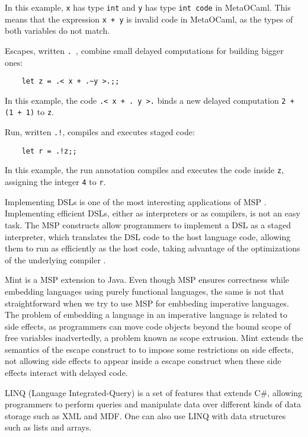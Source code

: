 \documentclass[english]{llncs}
\begin{document}
In this example, \texttt{x} has type \texttt{int} and \texttt{y} has
type \texttt{int code} in MetaOCaml. 
This means that the expression \texttt{x + y} is invalid code in MetaOCaml,
as the types of both variables do not match.

Escapes, written \texttt{.~}, combine small delayed computations for building
bigger ones:
\begin{verbatim}
    let z = .< x + .~y >.;;
\end{verbatim}

In this example, the code \texttt{.< x + .~y >.} binds a new delayed computation
\texttt{2 + (1 + 1)} to \texttt{z}.

Run, written \texttt{.!}, compiles and executes staged code:
\begin{verbatim}
    let r = .!z;;
\end{verbatim}

In this example, the run annotation compiles and executes the code inside
\texttt{z}, assigning the integer \texttt{4} to \texttt{r}.

Implementing DSLs is one of the most interesting applications of MSP \cite{Czarnecki2004DSL}.
Implementing efficient DSLs, either as interpreters or as compilers,
is not an easy task.
The MSP constructs allow programmers to implement a DSL as
a staged interpreter, which translates the DSL code to the host language code,
allowing them to run as efficiently as the host code, taking advantage
of the optimizations of the underlying compiler \cite{Taha2004gentle}.

Mint \cite{Westbrook2010Mint} is a MSP extension to Java.
Even though MSP ensures correctness while embedding languages using
purely functional languages, the same is not that straightforward when
we try to use MSP for embbeding imperative languages.
The problem of embedding a language in an imperative language is
related to side effects, as programmers can move code objects
beyond the bound scope of free variables inadvertedly, a problem
known as scope extrusion.
Mint extends the semantics of the escape construct to to impose
some restrictions on side effects, not allowing side effects to
appear inside a escape construct when these side effects interact
with delayed code.

LINQ (Language Integrated-Query) \cite{linq} is a set of features that
extends C\#, allowing programmers to perform queries and manipulate data over
different kinds of data storage such as XML and MDF.
One can also use LINQ with data structures such as lists and arrays.
\end{document}
